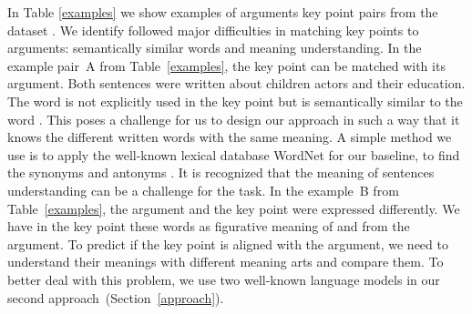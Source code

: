 In Table \ref{examples} we show examples of arguments key point pairs from the \ArgKP dataset \cite{Bar-HaimEFKLS2020}. 
We identify followed major difficulties in matching key points to arguments: semantically similar words and meaning understanding.
In the example pair~A from Table~\ref{examples}, the key point can be matched with its argument. Both sentences were written about children actors and their education. The word  is not explicitly used in the key point but is semantically similar to the word . 
This poses a challenge for us to design our approach in such a way that it knows the different written words with the same meaning. 
A simple method we use is to apply the well-known lexical database WordNet for our baseline, to find the synonyms and antonyms \cite{Miller1995}.
It is recognized that the meaning of sentences understanding can be a challenge for the task. 
In the example~B from Table~\ref{examples}, the argument and the key point were expressed differently. 
We have in the key point these words  as figurative meaning of  and  from the argument. 
To predict if the key point is aligned with the argument, we need to understand their meanings with different meaning arts and compare them. 
To better deal with this problem, we use two well-known language models in our second approach~(Section~\ref{approach}).